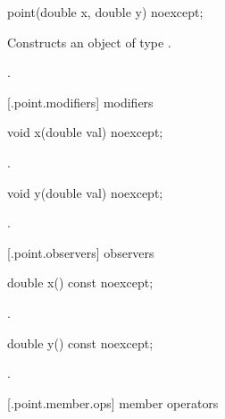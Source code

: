 \begin{itemdecl}
point(double x, double y) noexcept;
\end{itemdecl}
\begin{itemdescr}
	\pnum
	\effects
	Constructs an object of type .
	
	\pnum
	\postconditions
	.
\end{itemdescr}
	
 [\iotwod.point.modifiers]{ modifiers}

%
%
\begin{itemdecl}
void x(double val) noexcept;
\end{itemdecl}

\begin{itemdescr}
	\pnum
	\postconditions
	.
	
\end{itemdescr}

%
%
\begin{itemdecl}
    void y(double val) noexcept;
\end{itemdecl}
\begin{itemdescr}
	\pnum
	\postconditions
	.
	
\end{itemdescr}

 [\iotwod.point.observers]{ observers}

%
%
\begin{itemdecl}
    double x() const noexcept;
\end{itemdecl}
\begin{itemdescr}
	\pnum
	\returns
	.
\end{itemdescr}

%
%
\begin{itemdecl}
    double y() const noexcept;
\end{itemdecl}
\begin{itemdescr}
	\pnum
	\returns
	.
\end{itemdescr}

 [\iotwod.point.member.ops] { member operators}

